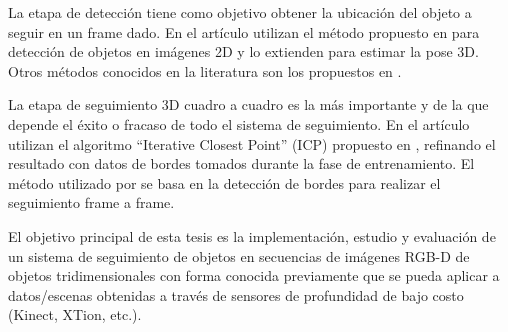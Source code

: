 La etapa de detección tiene como objetivo obtener la ubicación del objeto a seguir en un frame dado. En el artículo \cite{park2011texture} utilizan el método propuesto en \cite{hinterstoisser2010dominant} para detección de objetos en imágenes 2D y lo extienden para estimar la pose 3D. Otros métodos conocidos en la literatura son los propuestos en \cite{brunelli2009template,korman13fast}. 

La etapa de seguimiento 3D cuadro a cuadro es la más importante y de la que depende el éxito o fracaso de todo el sistema de seguimiento. En el artículo \cite{park2011texture} utilizan el algoritmo ``Iterative Closest Point'' (ICP) propuesto en \cite{zhang94icp,besl92icp}, refinando el resultado con datos de bordes tomados durante la fase de entrenamiento. El método utilizado por \cite{drummond1999real} se basa en la detección de bordes para realizar el seguimiento frame a frame.



El objetivo principal de esta tesis es la implementación, estudio y evaluación de un sistema de seguimiento de objetos en secuencias de imágenes RGB-D de objetos tridimensionales con forma conocida previamente que se pueda aplicar a datos/escenas obtenidas a través de sensores de profundidad de bajo costo (Kinect, XTion, etc.).

